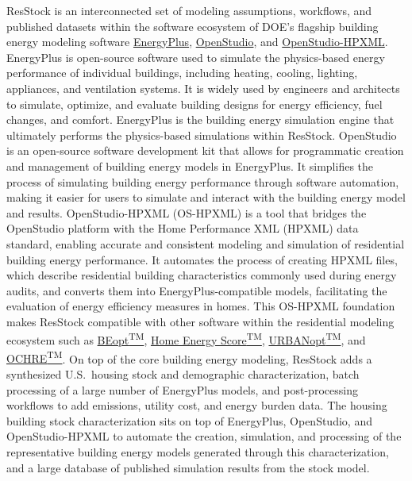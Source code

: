 ResStock is an interconnected set of modeling assumptions, workflows, and published datasets within the software ecosystem of DOE's flagship building energy modeling software \href{https://energyplus.net/}{EnergyPlus}, \href{https://openstudio.net/}{OpenStudio}, and \href{https://openstudio-hpxml.readthedocs.io/en/v1.8.1/}{OpenStudio-HPXML}. EnergyPlus is open-source software used to simulate the physics-based energy performance of individual buildings, including heating, cooling, lighting, appliances, and ventilation systems. It is widely used by engineers and architects to simulate, optimize, and evaluate building designs for energy efficiency, fuel changes, and comfort. EnergyPlus is the building energy simulation engine that ultimately performs the physics-based simulations within ResStock. OpenStudio is an open-source software development kit that allows for programmatic creation and management of building energy models in EnergyPlus. It simplifies the process of simulating building energy performance through software automation, making it easier for users to simulate and interact with the building energy model and results. OpenStudio-HPXML (OS-HPXML) is a tool that bridges the OpenStudio platform with the Home Performance XML (HPXML) data standard, enabling accurate and consistent modeling and simulation of residential building energy performance. It automates the process of creating HPXML files, which describe residential building characteristics commonly used during energy audits, and converts them into EnergyPlus-compatible models, facilitating the evaluation of energy efficiency measures in homes. This OS-HPXML foundation makes ResStock compatible with other software within the residential modeling ecosystem such as \href{https://www.nrel.gov/buildings/beopt.html}{BEopt\textsuperscript{TM}}, \href{https://www.energy.gov/eere/buildings/articles/home-energy-score}{Home Energy Score\textsuperscript{TM}}, \href{https://docs.urbanopt.net/}{URBANopt\textsuperscript{TM}}, and \href{https://github.com/NREL/OCHRE}{OCHRE\textsuperscript{TM}}. On top of the core building energy modeling, ResStock adds a synthesized U.S.~housing stock and demographic characterization, batch processing of a large number of EnergyPlus models, and post-processing workflows to add emissions, utility cost, and energy burden data. The housing building stock characterization sits on top of EnergyPlus, OpenStudio, and OpenStudio-HPXML to automate the creation, simulation, and processing of the representative building energy models generated through this characterization, and a large database of published simulation results from the stock model. 

